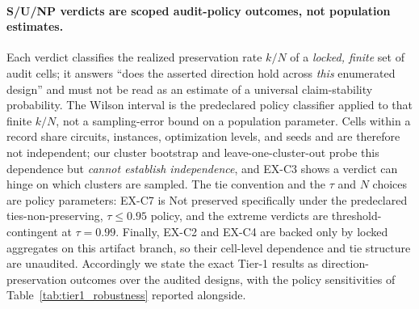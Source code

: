 \paragraph{S/U/NP verdicts are scoped audit-policy outcomes, not population estimates.}
Each verdict classifies the realized preservation rate $k/N$ of a \emph{locked, finite}
set of audit cells; it answers ``does the asserted direction hold across \emph{this}
enumerated design'' and must not be read as an estimate of a universal
claim-stability probability. The Wilson interval is the predeclared policy classifier
applied to that finite $k/N$, not a sampling-error bound on a population parameter.
Cells within a record share circuits, instances, optimization levels, and seeds and
are therefore not independent; our cluster bootstrap and leave-one-cluster-out probe
this dependence but \emph{cannot establish independence}, and EX-C3 shows a verdict
can hinge on which clusters are sampled. The tie convention and the $\tau$ and $N$
choices are policy parameters: EX-C7 is Not preserved specifically under the predeclared
ties-non-preserving, $\tau{\le}0.95$ policy, and the extreme verdicts are
threshold-contingent at $\tau{=}0.99$. Finally, EX-C2 and EX-C4 are backed only by
locked aggregates on this artifact branch, so their cell-level dependence and tie
structure are unaudited. Accordingly we state the exact Tier-1 results as
direction-preservation outcomes over the audited designs, with the policy
sensitivities of Table~\ref{tab:tier1_robustness} reported alongside.
